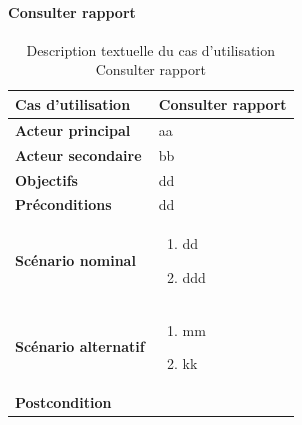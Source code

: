         \paragraph[Consulter rapport]{Consulter rapport}
        \begin{longtable}{p{4cm} p{9cm}}
            \caption{Description textuelle du cas d’utilisation Consulter rapport}
            \label{table:usecaseConsulterRapport}
            \\\hline\hline
                \textbf{Cas d’utilisation} & \textbf{Consulter rapport}
            \\\hline\hline
                    \textbf{Acteur principal} & aa
                \\
                    \textbf{Acteur secondaire} & bb
                \\
                    \textbf{Objectifs} & dd
                \\
                    \textbf{Préconditions} & dd
                \\
                \textbf{Scénario nominal} &
                    \begin{enumerate}[leftmargin=*]
                        \item dd
                        \item ddd
                    \end{enumerate}
                \\
                \textbf{Scénario alternatif} &
                    \begin{enumerate}[leftmargin=*]
                        \item mm
                        \item kk
                    \end{enumerate}
                \\
                \textbf{Postcondition}
            \\\bottomrule
        \end{longtable}
\pagebreak